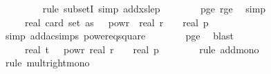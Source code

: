 \begin{isabellebody}
\ \ \ \ \ \ \ \isamarkupfalse%
\ {\isacharparenleft}{\kern0pt}rule\ subsetI{\isacharcomma}{\kern0pt}\ simp\ add{\isacharcolon}{\kern0pt}xs{\isacharunderscore}{\kern0pt}le{\isacharunderscore}{\kern0pt}p{\isacharparenright}{\kern0pt}\isanewline
\ \ \ \ \ \ \isamarkupfalse%
\ p{\isacharunderscore}{\kern0pt}ge{\isacharunderscore}{\kern0pt}{}\ r{\isacharunderscore}{\kern0pt}ge{\isacharunderscore}{\kern0pt}{}\ \isamarkupfalse%
\ simp{\isacharplus}{\kern0pt}\isanewline
\ \ \ \ \isamarkupfalse%
\ \isamarkupfalse%
\ {\isachardoublequoteopen}{\isachardot}{\kern0pt}{\isachardot}{\kern0pt}{\isachardot}{\kern0pt}\ {\isacharequal}{\kern0pt}\ {}\ {\isacharasterisk}{\kern0pt}\ {\isacharparenleft}{\kern0pt}real\ {\isacharparenleft}{\kern0pt}card\ {\isacharparenleft}{\kern0pt}set\ as{\isacharparenright}{\kern0pt}{\isacharparenright}{\kern0pt}{\isacharparenright}{\kern0pt}\ {\isacharasterisk}{\kern0pt}\ {}\ powr\ {\isacharparenleft}{\kern0pt}{\isacharminus}{\kern0pt}\ real\ r{\isacharparenright}{\kern0pt}\ {\isacharplus}{\kern0pt}\ {}\ {\isacharslash}{\kern0pt}\ real\ p{\isachardoublequoteclose}\isanewline
\ \ \ \ \ \ \isamarkupfalse%
\ {\isacharparenleft}{\kern0pt}simp\ add{\isacharcolon}{\kern0pt}ac{\isacharunderscore}{\kern0pt}simps\ power{}{\isacharunderscore}{\kern0pt}eq{\isacharunderscore}{\kern0pt}square{\isacharparenright}{\kern0pt}\isanewline
\ \ \ \ \ \ \isamarkupfalse%
\ p{\isacharunderscore}{\kern0pt}ge{\isacharunderscore}{\kern0pt}{}\ \isamarkupfalse%
\ blast\isanewline
\ \ \ \ \isamarkupfalse%
\ \isamarkupfalse%
\ {\isachardoublequoteopen}{\isachardot}{\kern0pt}{\isachardot}{\kern0pt}{\isachardot}{\kern0pt}\ {\isasymle}\ {}\ {\isacharasterisk}{\kern0pt}\ {\isacharparenleft}{\kern0pt}real\ t{\isacharparenright}{\kern0pt}\ {\isacharasterisk}{\kern0pt}\ {}\ powr\ {\isacharparenleft}{\kern0pt}{\isacharminus}{\kern0pt}real\ r{\isacharparenright}{\kern0pt}\ {\isacharplus}{\kern0pt}\ {}\ {\isacharslash}{\kern0pt}\ real\ p{\isachardoublequoteclose}\isanewline
\ \ \ \ \ \ \isamarkupfalse%
\ {\isacharparenleft}{\kern0pt}rule\ add{\isacharunderscore}{\kern0pt}mono{\isacharparenright}{\kern0pt}\isanewline
\ \ \ \ \ \ \ \isamarkupfalse%
\ {\isacharparenleft}{\kern0pt}rule\ mult{\isacharunderscore}{\kern0pt}right{\isacharunderscore}{\kern0pt}mono{\isacharparenright}{\kern0pt}\isanewline

\end{isabellebody}
